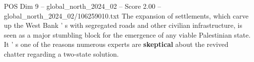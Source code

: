 \begin{textsample}{POS Dim 9 – global\_north\_2024\_02 – Score 2.00 – global\_north\_2024\_02/106259010.txt}
The expansion of settlements, which carve up the West Bank ' s with segregated roads and other civilian infrastructure, is seen as a major stumbling block for the emergence of any viable Palestinian state.
It ' s one of the reasons numerous experts are \textbf{skeptical} about the revived chatter regarding a two-state solution.

\end{textsample}
